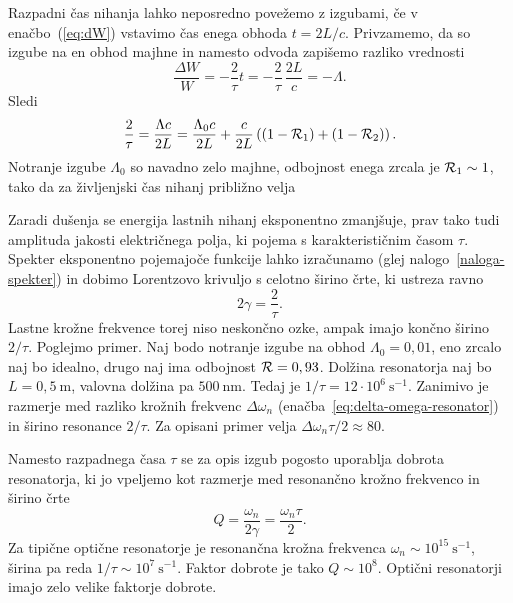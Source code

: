 Razpadni čas nihanja lahko neposredno povežemo z izgubami, če v enačbo~(\ref{eq:dW})
vstavimo čas enega obhoda $t=2L/c$. Privzamemo, da so izgube na en obhod majhne in namesto 
odvoda zapišemo razliko vrednosti
\begin{equation}
\frac{\Delta W}{W}= -\frac{2}{\tau} t = -\frac{2}{\tau}\, \frac{2L}{c} = -\Lambda.
\end{equation}
Sledi
\begin{equation}
\frac{2}{\tau}=\frac{\Lambda c}{2L}=\frac{\Lambda_0c}{2L}+\frac{c}{2L}\left((1-{\cal R}_{1})
+(1-{\cal R}_{2})\right).
\label{taulambda}
\end{equation}
Notranje izgube $\Lambda_0$ so navadno zelo majhne, 
odbojnost enega zrcala je ${\cal R}_{1} \sim 1$, tako da za življenjski čas 
nihanj približno velja

Zaradi dušenja se energija lastnih nihanj eksponentno zmanjšuje, prav tako tudi
amplituda jakosti električnega polja, ki pojema s karakterističnim časom $\tau$. 
Spekter eksponentno pojemajoče funkcije lahko izračunamo
(glej nalogo~\ref{naloga-spekter}) in dobimo Lorentzovo krivuljo 
s celotno širino črte, ki ustreza ravno
\begin{equation}
2\gamma=\frac{2}{\tau}.
\label{3.26}
\end{equation}
Lastne krožne frekvence torej niso neskončno ozke, ampak imajo končno širino $2/\tau$.
Poglejmo primer. Naj bodo notranje izgube na obhod $\Lambda_0=0,01$,
eno zrcalo naj bo idealno, drugo naj ima odbojnost ${\cal R}=0,93$. Dolžina
resonatorja naj bo $L=0,5~\si{\metre}$, valovna dolžina pa $500~\si{\nano\metre}$. Tedaj
je $1/\tau=12\cdot10^{6}~\si{\second}^{-1}$. Zanimivo je razmerje med 
razliko krožnih frekvenc $\Delta \omega_n$ 
(enačba~\ref{eq:delta-omega-resonator}) in širino resonance $2/\tau$. 
Za opisani primer velja $\Delta\omega_n\tau/2 \approx 80$.

\begin{remark}
Namesto razpadnega časa $\tau$ se za opis izgub pogosto uporablja
dobrota resonatorja, ki jo vpeljemo kot
razmerje med resonančno krožno frekvenco in širino črte 
\begin{equation}
Q=\frac{\omega_{n}}{2\gamma} = \frac{\omega_{n}\tau}{2}.
\end{equation}
Za tipične optične resonatorje je resonančna krožna
frekvenca $\omega_n \sim 10^{15}~\si{\second}^{-1}$, širina pa reda 
 $1/\tau \sim 10^{7}~\si{\second}^{-1}$. Faktor dobrote je tako $Q \sim 10^{8}$. Optični 
 resonatorji imajo zelo velike faktorje dobrote.
\end{remark}


